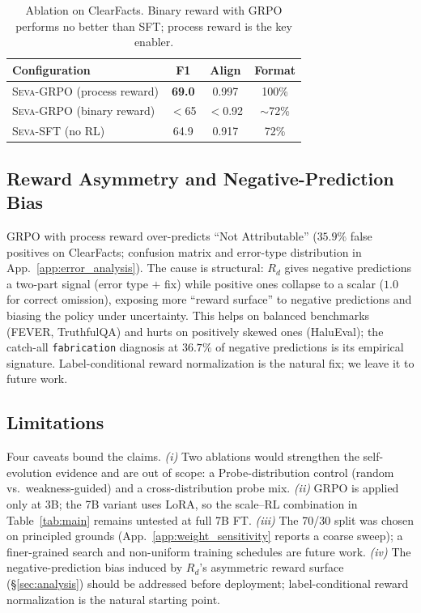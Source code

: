 \documentclass{article}
\newcommand{\seva}{\textsc{Seva}\xspace}
\newcommand{\realnumber}[1]{\textbf{#1}}
\begin{document}
\begin{table}[t]
\centering
\small
\caption{Ablation on ClearFacts. Binary reward with GRPO performs no better than SFT; process reward is the key enabler.}
\label{tab:ablation}
\begin{tabular}{lccc}
\toprule
\textbf{Configuration} & \textbf{F1} & \textbf{Align} & \textbf{Format} \\
\midrule
\seva-GRPO (process reward) & \realnumber{69.0} & 0.997 & 100\% \\
\seva-GRPO (binary reward) & $<$65 & $<$0.92 & $\sim$72\% \\
\seva-SFT (no RL) & 64.9 & 0.917 & 72\% \\
\bottomrule
\end{tabular}
\end{table}


\subsection{Reward Asymmetry and Negative-Prediction Bias}

GRPO with process reward over-predicts ``Not Attributable'' ($35.9\%$ false positives on ClearFacts; confusion matrix and error-type distribution in App.~\ref{app:error_analysis}).
The cause is structural: $R_d$ gives negative predictions a two-part signal (error type $+$ fix) while positive ones collapse to a scalar ($1.0$ for correct omission), exposing more ``reward surface'' to negative predictions and biasing the policy under uncertainty.
This helps on balanced benchmarks (FEVER, TruthfulQA) and hurts on positively skewed ones (HaluEval); the catch-all \texttt{fabrication} diagnosis at $36.7\%$ of negative predictions is its empirical signature.
Label-conditional reward normalization is the natural fix; we leave it to future work.


\subsection{Limitations}
\label{sec:limitations}

Four caveats bound the claims.
\emph{(i)} Two ablations would strengthen the self-evolution evidence and are out of scope: a Probe-distribution control (random vs.\ weakness-guided) and a cross-distribution probe mix.
\emph{(ii)} GRPO is applied only at 3B; the 7B variant uses LoRA, so the scale--RL combination in Table~\ref{tab:main} remains untested at full 7B FT.
\emph{(iii)} The 70/30 split was chosen on principled grounds (App.~\ref{app:weight_sensitivity} reports a coarse sweep); a finer-grained search and non-uniform training schedules are future work.
\emph{(iv)} The negative-prediction bias induced by $R_d$'s asymmetric reward surface (\S\ref{sec:analysis}) should be addressed before deployment; label-conditional reward normalization is the natural starting point.
\end{document}

